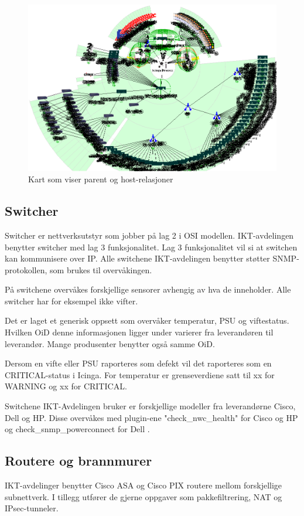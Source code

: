 \begin{figure}[H]
    \centering
    \includegraphics[scale=0.6]{img/statusmap}
    \caption{Kart som viser parent og host-relasjoner}
    \label{statusmap}
\end{figure}


\subsection{Switcher}\label{sec:switch}
Switcher er nettverksutstyr som jobber på lag 2 i OSI modellen. IKT-avdelingen benytter switcher med lag 3 funksjonalitet. Lag 3 funksjonalitet vil si at switchen kan kommunisere over IP. Alle switchene IKT-avdelingen benytter støtter SNMP-protokollen, som brukes til overvåkingen.

På switchene overvåkes forskjellige sensorer avhengig av hva de inneholder. Alle switcher har for eksempel ikke vifter.

Det er laget et generisk oppsett som overvåker temperatur, PSU og viftestatus. Hvilken OiD denne informasjonen ligger under varierer fra leverandøren til leverandør. Mange produsenter benytter også samme OiD. 

Dersom en vifte eller PSU raporteres som defekt vil det raporteres som en CRITICAL-status i Icinga. For temperatur er grenseverdiene satt til xx for WARNING og xx for CRITICAL.

Switchene IKT-Avdelingen bruker er forskjellige modeller fra leverandørne Cisco, Dell og HP. Disse overvåkes med plugin-ene "check\_nwc\_health" \cite{checknwc} for Cisco og HP og check\_snmp\_powerconnect for Dell \cite{checkpowerconnect}.

\subsection{Routere og brannmurer}
IKT-avdelinger benytter Cisco ASA og Cisco PIX routere mellom forskjellige subnettverk. I tillegg utfører de gjerne oppgaver som pakkefiltrering, NAT og IPsec-tunneler.
